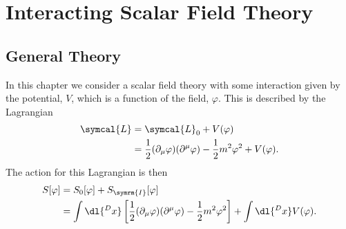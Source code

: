 \documentclass[fleqn]{NotesClass}
\newcommand{\lagrangianDensity}{\symcal{L}}
\newcommand{\interaction}{\symrm{I}}
\begin{document}
    \chapter{Interacting Scalar Field Theory}
    \section{General Theory}
    In this chapter we consider a scalar field theory with some interaction given by the potential, \(V\), which is a function of the field, \(\varphi\).
    This is described by the Lagrangian
    \begin{align}
        \lagrangianDensity &= \lagrangianDensity_0 + V(\varphi)\\
        &= \frac{1}{2} (\partial_\mu \varphi)(\partial^\mu \varphi) - \frac{1}{2}m^2\varphi^2 + V(\varphi).
    \end{align}
    The action for this Lagrangian is then
    \begin{align}
        S[\varphi] &= S_0[\varphi] + S_{\interaction}[\varphi]\\
        &= \int \dl{^Dx} \left[ \frac{1}{2}(\partial_\mu \varphi)(\partial^\mu \varphi) - \frac{1}{2}m^2\varphi^2 \right] + \int \dl{^Dx} V(\varphi).
    \end{align}
    
\end{document}
